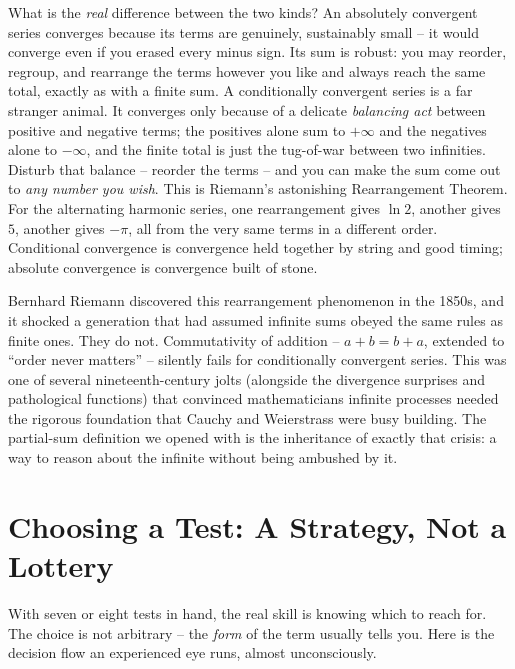 \begin{happeningbox}
What is the \emph{real} difference between the two kinds? An absolutely convergent series converges because its terms are genuinely, sustainably small -- it would converge even if you erased every minus sign. Its sum is robust: you may reorder, regroup, and rearrange the terms however you like and always reach the same total, exactly as with a finite sum. A conditionally convergent series is a far stranger animal. It converges only because of a delicate \emph{balancing act} between positive and negative terms; the positives alone sum to $+\infty$ and the negatives alone to $-\infty$, and the finite total is just the tug-of-war between two infinities. Disturb that balance -- reorder the terms -- and you can make the sum come out to \emph{any number you wish}. This is Riemann's astonishing Rearrangement Theorem. For the alternating harmonic series, one rearrangement gives $\ln 2$, another gives $5$, another gives $-\pi$, all from the very same terms in a different order. Conditional convergence is convergence held together by string and good timing; absolute convergence is convergence built of stone.
\end{happeningbox}

\begin{historybox}
Bernhard Riemann discovered this rearrangement phenomenon in the 1850s, and it shocked a generation that had assumed infinite sums obeyed the same rules as finite ones. They do not. Commutativity of addition -- $a+b=b+a$, extended to ``order never matters'' -- silently fails for conditionally convergent series. This was one of several nineteenth-century jolts (alongside the divergence surprises and pathological functions) that convinced mathematicians infinite processes needed the rigorous foundation that Cauchy and Weierstrass were busy building. The partial-sum definition we opened with is the inheritance of exactly that crisis: a way to reason about the infinite without being ambushed by it.
\end{historybox}

\section{Choosing a Test: A Strategy, Not a Lottery}
\label{ch29:strategy}

With seven or eight tests in hand, the real skill is knowing which to reach for. The choice is not arbitrary -- the \emph{form} of the term usually tells you. Here is the decision flow an experienced eye runs, almost unconsciously.

